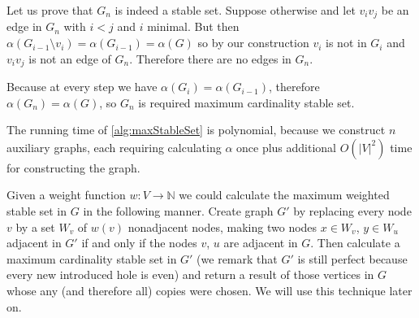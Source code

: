 Let us prove that $G_n$ is indeed a stable set. Suppose otherwise and let $v_iv_j$ be an edge in $G_n$ with $i < j$ and $i$ minimal. But then $\alpha(G_{i-1} \setminus v_i) = \alpha(G_{i-1}) = \alpha(G)$ so by our construction $v_i$ is not in $G_i$ and $v_iv_j$ is not an edge of $G_n$. Therefore there are no edges in $G_n$.

Because at every step we have $\alpha(G_i) = \alpha(G_{i-1})$, therefore $\alpha(G_n) = \alpha(G)$, so $G_n$ is required maximum cardinality stable set.

The running time of \cref{alg:maxStableSet} is polynomial, because we construct $n$ auxiliary graphs, each requiring calculating $\alpha$ once plus additional $O(|V|^2)$ time for constructing the graph.

Given a weight function $w : V \rightarrow \mathbb{N}$ we could calculate the maximum weighted stable set in $G$ in the following manner. Create graph $G'$ by replacing every node $v$ by a set $W_v$ of $w(v)$ nonadjacent nodes, making two nodes $x \in W_v$, $y \in W_u$ adjacent in $G'$ if and only if the nodes $v$, $u$ are adjacent in $G$. Then calculate a maximum cardinality stable set in $G'$ (we remark that $G'$ is still perfect because every new introduced hole is even) and return a result of those vertices in $G$ whose any (and therefore all) copies were chosen. We will use this technique later on.

